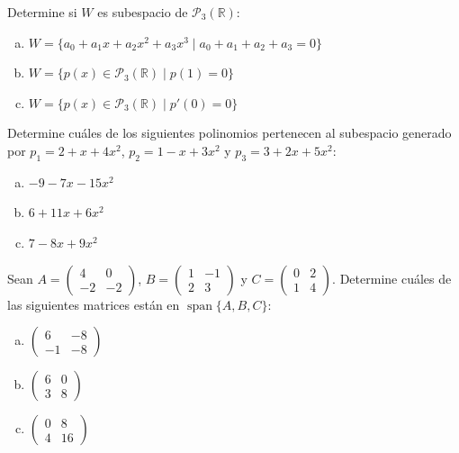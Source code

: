 \begin{prob} Determine si $W$ es subespacio de $\mathcal{P}_3(\mathbb{R})$:
\begin{enumerate}[(a)]
\item $W = \{a_0 + a_1x + a_2x^2 + a_3x^3 \mid a_0 + a_1 + a_2 + a_3 = 0\}$
\item $W = \{p(x) \in \mathcal{P}_3(\mathbb{R}) \mid p(1) = 0\}$
\item $W = \{p(x) \in \mathcal{P}_3(\mathbb{R}) \mid p'(0) = 0\}$
\end{enumerate}
\end{prob}

\begin{prob} Determine cuáles de los siguientes polinomios pertenecen al subespacio generado por $p_1 = 2 + x + 4x^2$, $p_2 = 1 - x + 3x^2$ y $p_3 = 3 + 2x + 5x^2$:
\begin{enumerate}[(a)]
\item $-9 - 7x - 15x^2$
\item $6 + 11x + 6x^2$
\item $7 - 8x + 9x^2$
\end{enumerate}
\end{prob}

\begin{prob} Sean $A = \begin{pmatrix} 4 & 0 \\ -2 & -2 \end{pmatrix}$, $B = \begin{pmatrix} 1 & -1 \\ 2 & 3 \end{pmatrix}$ y $C = \begin{pmatrix} 0 & 2 \\ 1 & 4 \end{pmatrix}$. Determine cuáles de las siguientes matrices están en $\operatorname{span}\{A, B, C\}$:
\begin{enumerate}[(a)]
\item $\begin{pmatrix} 6 & -8 \\ -1 & -8 \end{pmatrix}$
\item $\begin{pmatrix} 6 & 0 \\ 3 & 8 \end{pmatrix}$
\item $\begin{pmatrix} 0 & 8 \\ 4 & 16 \end{pmatrix}$
\end{enumerate}
\end{prob}

